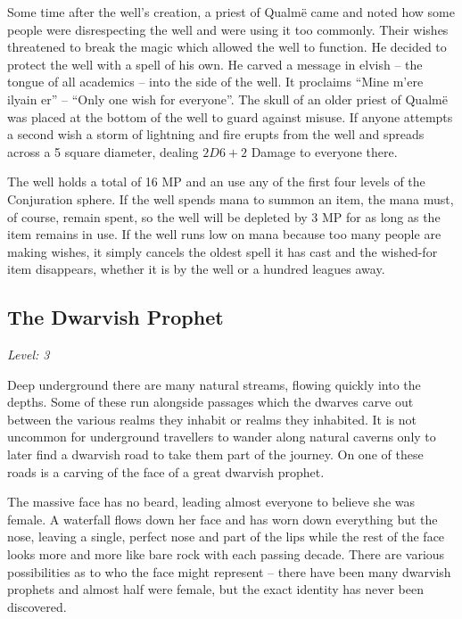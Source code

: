 \begin{multicols}{2}
Some time after the well's creation, a priest of Qualm\"{e} came and noted how some people were disrespecting the well and were using it too commonly.
Their wishes threatened to break the magic which allowed the well to function.
He decided to protect the well with a spell of his own.
He carved a message in elvish -- the tongue of all academics -- into the side of the well.
It proclaims ``Mine m'{e}re ilyain er'' -- ``Only one wish for everyone''.
The skull of an older priest of Qualm\"{e} was placed at the bottom of the well to guard against misuse.
If anyone attempts a second wish a storm of lightning and fire erupts from the well and spreads across a 5 square diameter, dealing $2D6+2$ Damage to everyone there.

The well holds a total of 16 MP and an use any of the first four levels of the Conjuration sphere.
If the well spends mana to summon an item, the mana must, of course, remain spent, so the well will be depleted by 3 MP for as long as the item remains in use.
If the well runs low on mana because too many people are making wishes, it simply cancels the oldest spell it has cast and the wished-for item disappears, whether it is by the well or a hundred leagues away.

\subsection{The Dwarvish Prophet}

\textit{Level: 3}

\noindent Deep underground there are many natural streams, flowing quickly into the depths.  Some of these run alongside passages which the dwarves carve out between the various realms they inhabit or realms they inhabited.  It is not uncommon for underground travellers to wander along natural caverns only to later find a dwarvish road to take them part of the journey.  On one of these roads is a carving of the face of a great dwarvish prophet.

\begin{boxtext}

  The massive face has no beard, leading almost everyone to believe she was female.
  A waterfall flows down her face and has worn down everything but the nose, leaving a single, perfect nose and part of the lips while the rest of the face looks more and more like bare rock with each passing decade.
  There are various possibilities as to who the face might represent -- there have been many dwarvish prophets and almost half were female, but the exact identity has never been discovered.


\end{boxtext}
\end{multicols}
